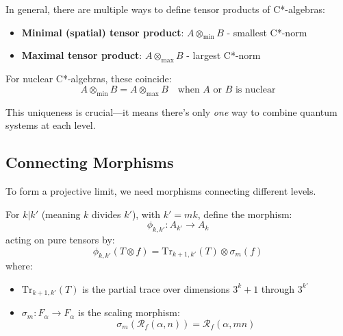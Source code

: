 \begin{level2}
In general, there are multiple ways to define tensor products of C*-algebras:
\begin{itemize}
\item \textbf{Minimal (spatial) tensor product}: $A \otimes_{\min} B$ - smallest C*-norm
\item \textbf{Maximal tensor product}: $A \otimes_{\max} B$ - largest C*-norm
\end{itemize}

For nuclear C*-algebras, these coincide:
\begin{equation}
A \otimes_{\min} B = A \otimes_{\max} B \quad \text{when $A$ or $B$ is nuclear}
\end{equation}

This uniqueness is crucial—it means there's only \textit{one} way to combine quantum systems at each level\cite{takesaki_theory_2002}.
\end{level2}

\subsection{Connecting Morphisms}

To form a projective limit, we need morphisms connecting different levels.

\begin{defn}\label{def:connecting-morphisms}
For $k | k'$ (meaning $k$ divides $k'$), with $k' = mk$, define the morphism:
\begin{equation}
\phi_{k,k'}: A_{k'} \to A_k
\end{equation}
acting on pure tensors by:
\begin{equation}
\phi_{k,k'}(T \otimes f) = \text{Tr}_{k+1,k'}(T) \otimes \sigma_m(f)
\end{equation}
where:
\begin{itemize}
\item $\text{Tr}_{k+1,k'}(T)$ is the partial trace over dimensions $3^{k}+1$ through $3^{k'}$
\item $\sigma_m: F_\alpha \to F_\alpha$ is the scaling morphism:
\begin{equation}
\sigma_m\left(\mathcal{R}_f(\alpha, n)\right) = \mathcal{R}_f(\alpha, mn)
\end{equation}
\end{itemize}
\end{defn}

